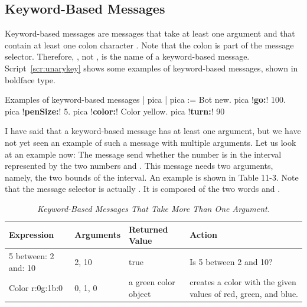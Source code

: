 \documentclass[a4paper,10pt,twoside]{book}
\begin{document}



\subsection{Keyword-Based Messages}

Keyword-based messages are messages that take at least one argument and that contain at least 
one colon character \ct{:}. Note that the colon is part of the message selector. Therefore, , not ,  is the name of a keyword-based message. Script~\ref{scr:unarykey} shows some examples of keyword-based 
messages, shown in boldface type. 



\begin{script}[unarykey]{Examples of keyword-based messages}
	| pica | 
	pica := Bot new. 
	pica !\textbf{go:}! 100. 
	pica !\textbf{penSize:}! 5. 
	pica !\textbf{color:}! Color yellow. 
	pica !\textbf{turn:}! 90
\end{script}


I have said that a keyword-based message has at least one argument, but we have not yet 
seen an example of such a message with multiple arguments. Let us look at an example now: 
The message send  whether the number 
 is in the interval represented by the two numbers  and . 
This message needs two arguments, namely, the two bounds of the interval. An example is 
shown in Table 11-3. Note that the message selector is actually . It is composed 
of the two words  and . 


\begin{table}[h]
 \caption{\emph{Keyword-Based Messages That Take More Than One Argument.}\label{tab1103}}
 \begin{center}
 {\small \begin{tabular}{p{25mm}p{18mm}p{20mm}p{40mm}}
 \hline
 \textbf{Expression} & \textbf{Arguments} &\textbf{Returned Value} & \textbf{Action}\\ \hline
5 between: 2 and: 10 &2, 10&true &Is 5 between 2 and 10? \\
Color r:0g:1b:0 &0, 1, 0&a green color object&creates a color with the given values of red, green, and blue. \\ \hline
 \end{tabular}}
 \end{center}
 \end{table}
\end{document}
